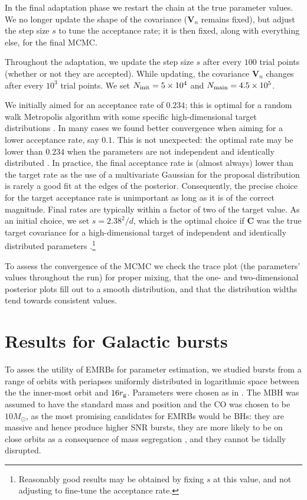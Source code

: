In the final adaptation phase we restart the chain at the true parameter values. We no longer update the shape of the covariance ($\boldsymbol{V}_n$ remains fixed), but adjust the step size $s$ to tune the acceptance rate; it is then fixed, along with everything else, for the final MCMC.

Throughout the adaptation, we update the step size $s$ after every $100$ trial points (whether or not they are accepted). While updating, the covariance $\boldsymbol{V}_n$ changes after every $10^3$ trial points. We set $N_\mathrm{init} = 5 \times 10^4$ and $N_\mathrm{main} = 4.5 \times 10^5$.

We initially aimed for an acceptance rate of $0.234$; this is optimal for a random walk Metropolis algorithm with some specific high-dimensional target distributions \citep{Roberts1997,Roberts2001}. In many cases we found better convergence when aiming for a lower acceptance rate, say $0.1$. This is not unexpected: the optimal rate may be lower than $0.234$ when the parameters are not independent and identically distributed \citep{Bedard2007, Bedard2008a, Bedard2008}. In practice, the final acceptance rate is (almost always) lower than the target rate as the use of a multivariate Gaussian for the proposal distribution is rarely a good fit at the edges of the posterior. Consequently, the precise choice for the target acceptance rate is unimportant as long as it is of the correct magnitude. Final rates are typically within a factor of two of the target value. As an initial choice, we set $s = 2.38^2/d$, which is the optimal choice if $\boldsymbol{C}$ was the true target covariance for a high-dimensional target of independent and identically distributed parameters \citep{Gelman1996,Roberts1997,Roberts2001,Haario2001}.\footnote{Reasonably good results may be obtained by fixing $s$ at this value, and not adjusting to fine-tune the acceptance rate.}

To assess the convergence of the MCMC we check the trace plot (the parameters' values throughout the run) for proper mixing, that the one- and two-dimensional posterior plots fill out to a smooth distribution, and that the distribution widths tend towards consistent values.

\section{Results for Galactic bursts}\label{sec:Gal-Results}

To asses the utility of EMRBs for parameter estimation, we studied bursts from a range of orbits with periapses uniformly distributed in logarithmic space between the the inner-most orbit and $16 r_\mathrm{g}$. Parameters were chosen as in . The MBH was assumed to have the standard mass and position and the CO was chosen to be $10 M_\odot$, as the most promising candidates for EMRBs would be BHs: they are massive and hence produce higher SNR bursts, they are more likely to be on close orbits as a consequence of mass segregation \citep{Bahcall1977, Alexander2009}, and they cannot be tidally disrupted.

